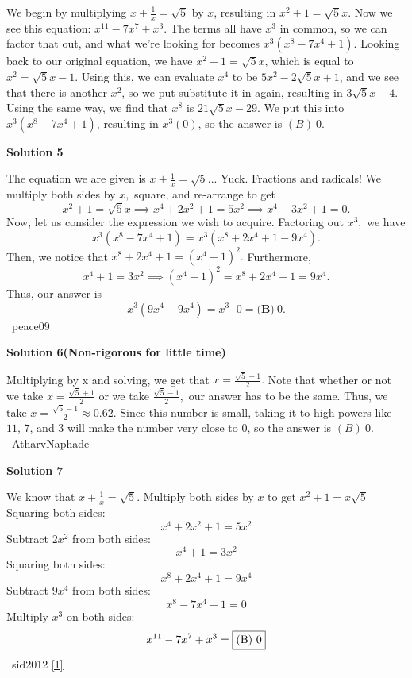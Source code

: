 \begin{enumerate}
We begin by multiplying $x+\frac{1}{x} = \sqrt{5}$ by $x$, resulting in $x^2+1 = \sqrt{5}x$. Now we see this equation: $x^{11}-7x^{7}+x^3$. The terms all have $x^3$ in common, so we can factor that out, and what we're looking for becomes $x^3(x^8-7x^4+1)$. Looking back to our original equation, we have $x^2+1 = \sqrt{5}x$, which is equal to $x^2 = \sqrt{5}x-1$. Using this, we can evaluate $x^4$ to be $5x^2-2\sqrt{5}x+1$, and we see that there is another $x^2$, so we put substitute it in again, resulting in $3\sqrt{5}x-4$. Using the same way, we find that $x^8$ is $21\sqrt{5}x-29$. We put this into $x^3(x^8-7x^4+1)$, resulting in $x^3(0)$, so the answer is $\boxed{(B)~0}$.

 



\textbf{Solution 5}

The equation we are given is $x+\frac{1}{x}=\sqrt{5}...$ Yuck. Fractions and radicals! We multiply both sides by $x,$ square, and re-arrange to get 
 \[x^2+1=\sqrt{5}x \implies x^4+2x^2+1=5x^2 \implies x^4-3x^2+1=0.\] Now, let us consider the expression we wish to acquire. Factoring out $x^3,$ we have 
 \[x^3\left(x^8-7x^4+1\right) = x^3\left(x^8+2x^4+1-9x^4\right).\] Then, we notice that $x^8+2x^4+1=\left(x^4+1\right)^2.$ Furthermore, 
 \[x^4+1=3x^2 \implies \left(x^4+1\right)^2=x^8+2x^4+1=9x^4.\] Thus, our answer is 
 \[x^3\left(9x^4-9x^4\right) = x^3 \cdot 0 = \boxed{\textbf{(B)}} ~ 0.\]~peace09

 



\textbf{Solution 6(Non-rigorous for little time)}

Multiplying by x and solving, we get that $x = \frac{\sqrt{5} \pm 1}{2}.$ Note that whether or not we take $x = \frac{\sqrt{5} + 1}{2}$ or we take $\frac{\sqrt{5} - 1}{2},$ our answer has to be the same. Thus, we take $x = \frac{\sqrt{5} - 1}{2} \approx 0.62$. Since this number is small, taking it to high powers like $11$, $7$, and $3$ will make the number very close to $0$, so the answer is $\boxed{(B)~0}.$ ~AtharvNaphade

 



\textbf{Solution 7}

We know that $x+\frac{1}{x}=\sqrt{5}$. Multiply both sides by $x$ to get $x^2+1=x\sqrt{5}$Squaring both sides: 
 \[x^4+2x^2+1=5x^2\]Subtract $2x^2$ from both sides: 
 \[x^4+1=3x^2\]Squaring both sides: 
 \[x^8+2x^4+1=9x^4\]Subtract $9x^4$ from both sides: 
 \[x^8-7x^4+1=0\]Multiply $x^3$ on both sides: 
 \[x^{11}-7x^7+x^3=\fbox{(B) 0}\]~sid2012 \href{https://artofproblemsolving.com/wiki/index.php/User:Sid2012}{[1]}


\end{enumerate}
